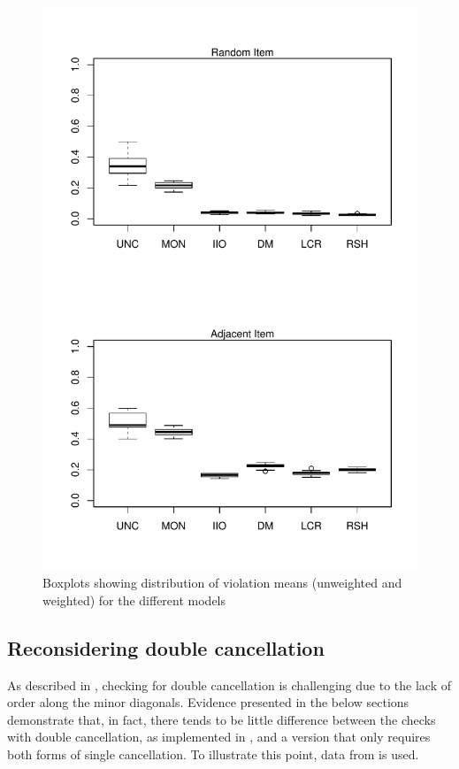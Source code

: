 \documentclass[12pt]{article}
\begin{document}
\begin{figure}
\centering
\caption{Boxplots showing distribution of violation means (unweighted and weighted) for the different models} \label{boxplots}
\includegraphics[height=\textheight]{./figs/boxplots}
\end{figure}


\subsection{Reconsidering double cancellation}
As described in , checking for double cancellation is challenging due to the lack of order along the minor diagonals. Evidence presented in the below sections demonstrate that, in fact, there tends to be little difference between the checks with double cancellation, as implemented in , and a version that only requires both forms of single cancellation. To illustrate this point, data from  is used.
\end{document}
